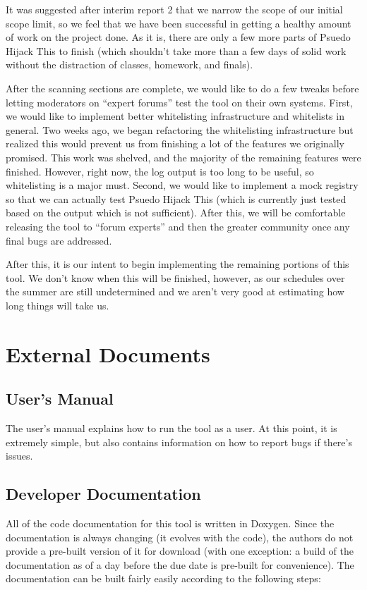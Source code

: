 \documentclass[letterpaper,12pt]{article}
\begin{document}
It was suggested after interim report 2 that we narrow the scope of our initial
scope limit, so we feel that we have been successful in getting a healthy amount
of work on the project done.  As it is, there are only a few more parts of
Psuedo Hijack This to finish (which shouldn't take more than a few days of
solid work without the distraction of classes, homework, and finals).

After the scanning sections are complete, we would like to do a few tweaks
before letting moderators on ``expert forums'' test the tool on their own
systems.  First, we would like to implement better whitelisting infrastructure
and whitelists in general.  Two weeks ago, we began refactoring the whitelisting
infrastructure but realized this would prevent us from finishing a lot of the
features we originally promised.  This work was shelved, and the majority of the
remaining features were finished.  However, right now, the log output is too
long to be useful, so whitelisting is a major must.  Second, we would like to
implement a mock registry so that we can actually test Psuedo Hijack This
(which is currently just tested based on the output which is not sufficient). 
After this, we will be comfortable releasing the tool to ``forum experts'' and
then the greater community once any final bugs are addressed.

After this, it is our intent to begin implementing the remaining portions of
this tool.  We don't know when this will be finished, however, as our schedules
over the summer are still undetermined and we aren't very good at estimating how
long things will take us.  

\newpage



\section{External Documents} \label{documents}
\subsection{User's Manual}
The user's manual \cite{Manual} explains how to run the tool as a user.  At this
point, it is extremely simple, but also contains information on how to report
bugs if there's issues.  

\subsection{Developer Documentation}
All of the code documentation for this tool is written in Doxygen.  Since the
documentation is always changing (it evolves with the code), the authors do not
provide a pre-built version of it for download (with one exception: a build of
the documentation as of a day before the due date is pre-built for convenience).
The documentation can be built fairly easily according to the following steps:
\end{document}
